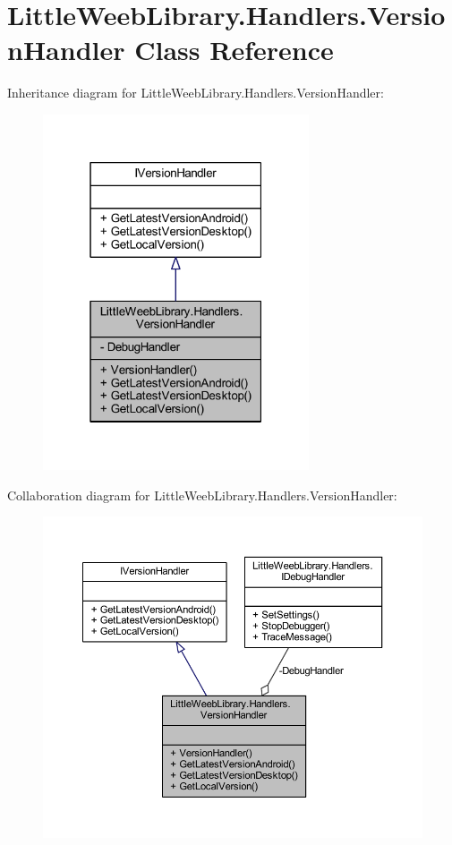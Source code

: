 \hypertarget{class_little_weeb_library_1_1_handlers_1_1_version_handler}{}\section{Little\+Weeb\+Library.\+Handlers.\+Version\+Handler Class Reference}
\label{class_little_weeb_library_1_1_handlers_1_1_version_handler}


Inheritance diagram for Little\+Weeb\+Library.\+Handlers.\+Version\+Handler\+:\nopagebreak
\begin{figure}[H]
\begin{center}
\leavevmode
\includegraphics[width=223pt]{class_little_weeb_library_1_1_handlers_1_1_version_handler__inherit__graph}
\end{center}
\end{figure}


Collaboration diagram for Little\+Weeb\+Library.\+Handlers.\+Version\+Handler\+:\nopagebreak
\begin{figure}[H]
\begin{center}
\leavevmode
\includegraphics[width=350pt]{class_little_weeb_library_1_1_handlers_1_1_version_handler__coll__graph}
\end{center}
\end{figure}
